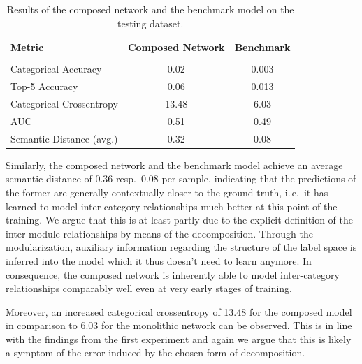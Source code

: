 \begin{table}
    \centering
    \begin{tabular}{|l|c|c|}
        \hline
        \textbf{Metric} & \textbf{Composed Network} & \textbf{Benchmark} \\
        \hline
        \multicolumn{3}{c}{} \\[-2ex]
        \hline
        Categorical Accuracy & 0.02 & 0.003 \\
        \hline
        Top-5 Accuracy & 0.06 & 0.013 \\
        \hline
        Categorical Crossentropy & 13.48 & 6.03 \\
        \hline
        AUC & 0.51 & 0.49 \\
        \hline
        Semantic Distance (avg.) & 0.32 & 0.08 \\
        \hline
    \end{tabular}
    \caption{Results of the composed network and the benchmark model on the testing dataset.}
    \label{tab:experiments_imagenet_results_comparison}
\end{table}

Similarly, the composed network and the benchmark model achieve an average semantic distance of 0.36 resp.\ 0.08 per sample, indicating that the predictions of the former are generally contextually closer to the ground truth, i.\,e.\ it has learned to model inter-category relationships much better at this point of the training. We argue that this is at least partly due to the explicit definition of the inter-module relationships by means of the decomposition. Through the modularization, auxiliary information regarding the structure of the label space is inferred into the model which it thus doesn't need to learn anymore. In consequence, the composed network is inherently able to model inter-category relationships comparably well even at very early stages of training.

Moreover, an increased categorical crossentropy of 13.48 for the composed model in comparison to 6.03 for the monolithic network can be observed. This is in line with the findings from the first experiment and again we argue that this is likely a symptom of the error induced by the chosen form of decomposition.

